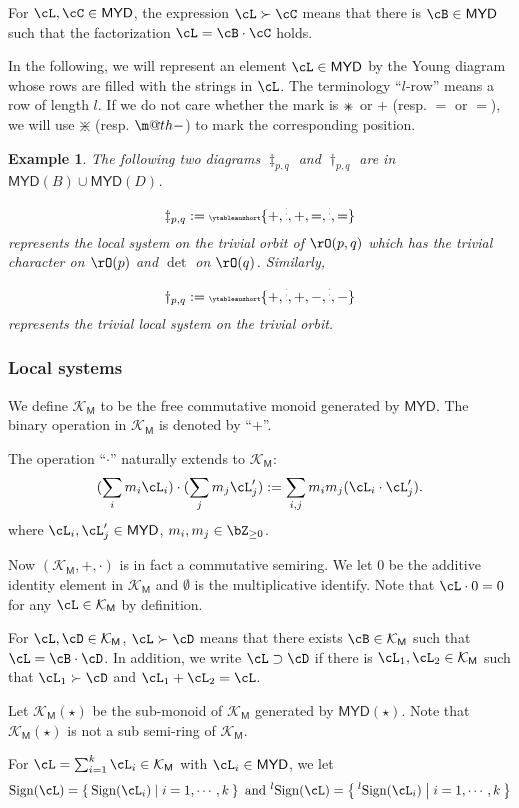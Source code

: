 \documentclass[12pt,a4paper]{amsart}
\makeatletter
\def\MYD{{\mathsf{MYD}}}
\def\KM{{\mathcal{K_{\mathsf{M}}}}}
\numberwithin{equation}{section}
\newtheorem{eg}[thm]{Example}
\theoremstyle{remark}
\def\lsign{{}^l\mathrm{Sign}}
\def\ssign{\mathrm{Sign}}
\let\ytb=\ytableaushort
\newcommand{\tytb}[1]{{\tiny\ytb{#1}}}
\newcommand{\dotminus}{\mathbin{\text{\@dotminus}}}
\newcommand{\@dotminus}{%
  \ooalign{\hidewidth\raise1ex\hbox{.}\hidewidth\cr$\m@th-$\cr}%
}
\def\uum{{\dotminus}}
\def\uup{\divideontimes}
\def\umm{{=}}
\def\upp{{\ast}}
\def\upp{
  {{\setbox0\hbox{$\times$}
      \rlap{\hbox to \wd0{\hss$+$\hss}}\box0
    }}
}
\makeatother
\begin{document}
For  $\cL,\cC\in \MYD$, the expression $\cL\succ\cC$ means that there is $\cB\in \MYD$
such that the
factorization $\cL = \cB\cdot \cC$ holds.

In the following, we will represent an element $\cL\in \MYD$ by the Young diagram whose rows are
filled with the strings in $\cL$. The terminology ``$l$-row'' means a row of length $l$.
If we do not care whether the mark is $\upp$ or $+$ (resp.  $\umm$ or $=$), we will use $\uup$ (resp. $\uum$)
to mark the corresponding position.

\begin{eg}
  The following two diagrams $\ddagger_{p,q}$ and $\dagger_{p,q}$ are in
  $\MYD(B)\cup \MYD(D)$.
  \[
    \ddagger_{p,q} := \tytb{+,\vdots,+,=,\vdots,=}
  \]
  represents the local system on the trivial orbit of $\rO(p,q)$ which has the
  trivial character on $\rO(p)$ and $\det$ on $\rO(q)$. Similarly,
  \[
    \dagger_{p,q}:= \tytb{+,\vdots,+,-,\vdots,-}
  \]
  represents the trivial local system on the trivial orbit.
\end{eg}



\subsubsection{Local systems}
We define  $\KM$ to be the free commutative monoid generated by $\MYD$.
The binary operation in $\KM$ is denoted by ``$+$''.

The operation ``$\cdot$'' naturally extends to $\KM$:
\[
  (\sum_{i}  m_{i}\cL_{i})\cdot (\sum_{j} m_{j}\cL'_{j}) := \sum_{i,j} m_{i}m_{j}(\cL_{i}\cdot \cL'_{j}).
\]
where $\cL_{i},\cL'_{j}\in \MYD$, $m_{i},m_{j}\in \bZ_{\geq 0}$.

Now $(\KM, +, \cdot)$ is in fact a commutative semiring. We let $0$ be the
additive identity element in $\KM$ and $\emptyset$ is the multiplicative
identify. Note that $\cL\cdot 0=0$ for any
 $\cL\in \KM$ by definition.

For $\cL,\cD\in \KM$, $\cL\succ \cD$ means that there exists $\cB\in \KM$ such that
$\cL=\cB\cdot \cD$.
In addition, we write $\cL\supset \cD$ if there is $\cL_{1},\cL_{2}\in \KM$ such
that $\cL_{1}\succ \cD$ and $\cL_{1}+\cL_{2}=\cL$.

Let $\KM(\star)$ be the sub-monoid of $\KM$ generated by $\MYD(\star)$.
Note that $\KM(\star)$ is not a sub semi-ring of $\KM$.

For $\cL = \sum_{i=1}^{k}\cL_{i}\in \KM$ with $\cL_{i}\in \MYD$, we let
\[
  \ssign(\cL)= \Set{\ssign(\cL_{i})|i=1,\cdots,k}\text{ and }
  \lsign(\cL)= \Set{\lsign(\cL_{i})|i=1,\cdots,k}
\]
\end{document}
